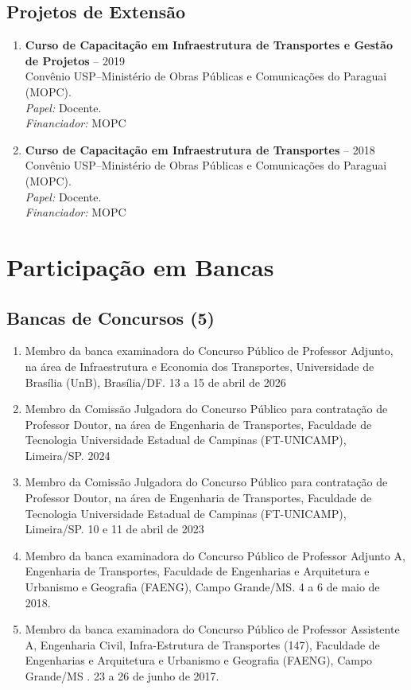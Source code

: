 \documentclass[
  brazilian,
  11pt,
  a4paper,
]{article}
\begin{document}
\subsection{Projetos de Extensão}\label{projetos-de-extensuxe3o}

\begin{enumerate}
\def\labelenumi{\arabic{enumi}.}
\item
  \textbf{Curso de Capacitação em Infraestrutura de Transportes e Gestão
  de Projetos} -- 2019\\
  Convênio USP--Ministério de Obras Públicas e Comunicações do Paraguai
  (MOPC).\\
  \emph{Papel:} Docente.\\
  \emph{Financiador:} MOPC
\item
  \textbf{Curso de Capacitação em Infraestrutura de Transportes} --
  2018\\
  Convênio USP--Ministério de Obras Públicas e Comunicações do Paraguai
  (MOPC).\\
  \emph{Papel:} Docente.\\
  \emph{Financiador:} MOPC
\end{enumerate}

\section{Participação em Bancas}\label{participauxe7uxe3o-em-bancas}

\subsection{Bancas de Concursos (5)}\label{bancas-de-concursos-5}

\begin{enumerate}
\def\labelenumi{\arabic{enumi}.}
\item
  Membro da banca examinadora do Concurso Público de Professor Adjunto,
  na área de Infraestrutura e Economia dos Transportes, Universidade de
  Brasília (UnB), Brasília/DF. 13 a 15 de abril de 2026
\item
  Membro da Comissão Julgadora do Concurso Público para contratação de
  Professor Doutor, na área de Engenharia de Transportes, Faculdade de
  Tecnologia Universidade Estadual de Campinas (FT-UNICAMP), Limeira/SP.
  2024
\item
  Membro da Comissão Julgadora do Concurso Público para contratação de
  Professor Doutor, na área de Engenharia de Transportes, Faculdade de
  Tecnologia Universidade Estadual de Campinas (FT-UNICAMP), Limeira/SP.
  10 e 11 de abril de 2023
\item
  Membro da banca examinadora do Concurso Público de Professor Adjunto
  A, Engenharia de Transportes, Faculdade de Engenharias e Arquitetura e
  Urbanismo e Geografia (FAENG), Campo Grande/MS. 4 a 6 de maio de 2018.
\item
  Membro da banca examinadora do Concurso Público de Professor
  Assistente A, Engenharia Civil, Infra-Estrutura de Transportes (147),
  Faculdade de Engenharias e Arquitetura e Urbanismo e Geografia
  (FAENG), Campo Grande/MS . 23 a 26 de junho de 2017.
\end{enumerate}
\end{document}
